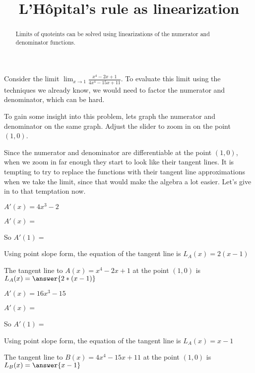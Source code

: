 \documentclass{ximera}
\title[ Dig-In:]{L'H\^{o}pital's rule as linearization}
\begin{document}
\begin{abstract}
   Limits of quoteints can be solved using linearizations of the numerator and denominator functions.
\end{abstract}

Consider the limit \(\displaystyle\lim_{x \to 1} \frac{x^4-2x+1}{4x^4 - 15x +11}\).  To evaluate this limit using the 
techniques we already know, we would need to factor the numerator and denominator, which can be hard.

To gain some insight into this problem, lets graph the numerator and denominator on the same graph. Adjust the slider
to zoom in on the point $(1,0)$.


Since the numerator and denominator are differentiable at the point $(1,0)$, 
when we zoom in far enough they start to look like their tangent lines.  It is tempting to try to replace the functions
with their tangent line approximations when we take the limit, since that would make the algebra a lot easier.  Let's
give in to that temptation now.

\begin{question}
  \begin{hint}
      \begin{hint}
        $A'(x) = 4x^3-2$
      \end{hint}
      $A'(x)=$
  \end{hint}
  \begin{hint}
    So $A'(1)=$
  \end{hint}
  \begin{hint}
    Using point slope form, the equation of the tangent line is $L_A(x) = 2(x-1)$
  \end{hint}
  
  The tangent line to $A(x) = x^4-2x+1$ at the point $(1,0)$ is $L_A(x) =\answer{2*(x-1)}$
\end{question}

\begin{question}
\begin{hint}
      \begin{hint}
        $A'(x) = 16x^3-15$
      \end{hint}
      $A'(x)=$
  \end{hint}
  \begin{hint}
    So $A'(1)=$
  \end{hint}
  \begin{hint}
    Using point slope form, the equation of the tangent line is $L_A(x) = x-1$
  \end{hint}
  The tangent line to $B(x) = 4x^4-15x+11$ at the point $(1,0)$ is $ L_B(x)= \answer{x-1}$
\end{question}
\end{document}
